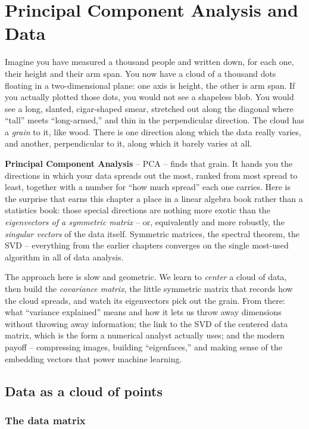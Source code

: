 \chapter{Principal Component Analysis and Data}

Imagine you have measured a thousand people and written down, for each one, their
height and their arm span. You now have a cloud of a thousand dots floating in a
two-dimensional plane: one axis is height, the other is arm span. If you actually
plotted those dots, you would not see a shapeless blob. You would see a long,
slanted, cigar-shaped smear, stretched out along the diagonal where ``tall'' meets
``long-armed,'' and thin in the perpendicular direction. The cloud has a
\emph{grain} to it, like wood. There is one direction along which the data really
varies, and another, perpendicular to it, along which it barely varies at all.

\textbf{Principal Component Analysis} -- PCA -- finds that grain. It hands you the
directions in which your data spreads out the most, ranked from most spread to
least, together with a number for ``how much spread'' each one carries. Here is the
surprise that earns this chapter a place in a linear algebra book rather than a
statistics book: those special directions are nothing more exotic than the
\emph{eigenvectors of a symmetric matrix} -- or, equivalently and more robustly, the
\emph{singular vectors} of the data itself. Symmetric matrices, the spectral
theorem, the SVD -- everything from the earlier chapters converges on the single
most-used algorithm in all of data analysis.

The approach here is slow and geometric. We learn to \emph{center} a cloud of data,
then build the \emph{covariance matrix}, the little symmetric matrix that records
how the cloud spreads, and watch its eigenvectors pick out the grain. From there:
what ``variance explained'' means and how it lets us throw away dimensions without
throwing away information; the link to the SVD of the centered data matrix, which is
the form a numerical analyst actually uses; and the modern payoff -- compressing
images, building ``eigenfaces,'' and making sense of the embedding vectors that
power machine learning.

\chapterline

\section{Data as a cloud of points}

\subsection{The data matrix}

